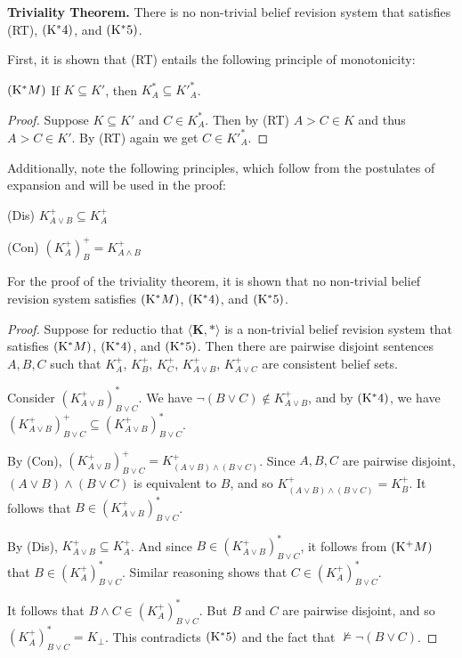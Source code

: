 \documentclass[12pt]{article}
\begin{document}
\textbf{Triviality Theorem.} There is no non-trivial belief revision system that satisfies (RT), $\pst{*4}$, and $\pst{*5}$.

First, it is shown that (RT) entails the following principle of monotonicity:

$\pst{*M}$ If $K \subseteq K'$, then $K_A^* \subseteq {K'}_A^*$.

\begin{proof}
Suppose $K \subseteq K'$ and $C\in K_A^*$. Then by (RT) $A>C \in K$ and thus $A>C \in K'$. By (RT) again we get $C\in {K'}_A^*$.
\end{proof}

Additionally, note the following principles, which follow from the postulates of expansion and will be used in the proof:\footnotemark

(Dis) $K_{A\lor B}^+ \subseteq K_{A}^+$

(Con) $(K_A^+)_B^+ = K_{A\land B}^+$


For the proof of the triviality theorem, it is shown that no non-trivial belief revision system satisfies $\pst{*M}$, $\pst{*4}$, and $\pst{*5}$.

\begin{proof}
Suppose for reductio that $\langle \mathbf{K}, * \rangle$ is a non-trivial belief revision system that satisfies $\pst{*M}$, $\pst{*4}$, and $\pst{*5}$. Then there are pairwise disjoint sentences $A,B,C$ such that $K_A^+$, $K_B^+$, $K_C^+$, $K_{A\lor B}^+$, $K_{A\lor C}^+$ are consistent belief sets.

Consider $(K_{A\lor B}^+)_{B\lor C}^*$. We have $\neg(B \lor C) \not\in K_{A\lor B}^+$, and by $\pst{*4}$, we have $(K_{A\lor B}^+)_{B\lor C}^+ \subseteq (K_{A\lor B}^+)_{B\lor C}^*$.

By (Con), $(K_{A\lor B}^+)_{B\lor C}^+ = K_{(A\lor B) \land (B\lor C)}^+$. Since $A,B,C$ are pairwise disjoint, $(A\lor B) \land (B\lor C)$ is equivalent to $B$, and so $K_{(A\lor B) \land (B\lor C)}^+ = K_B^+$. It follows that $B \in (K_{A\lor B}^+)_{B\lor C}^*$.

By (Dis), $K_{A\lor B}^+ \subseteq K_A^+$. And since $B \in (K_{A\lor B}^+)_{B\lor C}^*$, it follows from $\pst{+M}$ that $B \in (K_A^+)_{B\lor C}^*$. Similar reasoning shows that $C \in (K_A^+)_{B\lor C}^*$.

It follows that $B \land C \in (K_A^+)_{B\lor C}^*$. But $B$ and $C$ are pairwise disjoint, and so $(K_A^+)_{B\lor C}^* = K_\bot$. This contradicts $\pst{*5}$ and the fact that $\not\vDash \neg(B \lor C)$. 
\end{proof}
\end{document}
